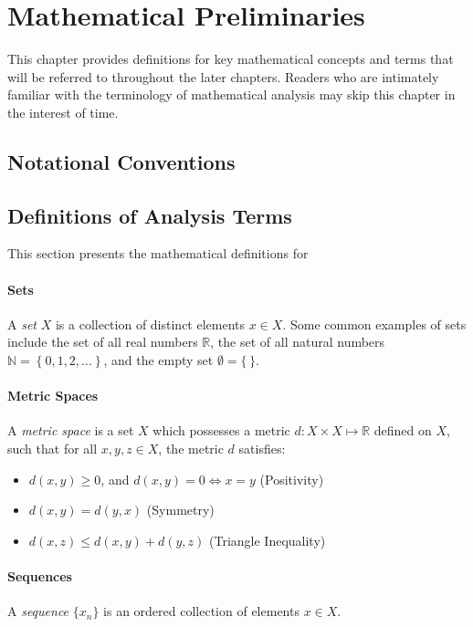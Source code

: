 \chapter{Mathematical Preliminaries}
%

This chapter provides definitions for key mathematical concepts and terms that will be referred to throughout the later chapters. Readers who are intimately familiar with the terminology of mathematical analysis may skip this chapter in the interest of time.

\section{Notational Conventions}

\section{Definitions of Analysis Terms}

This section presents the mathematical definitions for 

\subsubsection*{Sets} A \textit{set} $X$ is a collection of distinct elements $x \in X$. Some common examples of sets include the set of all real numbers $\mathbb{R}$, the set of all natural numbers $\mathbb{N} = \left\{ 0, 1, 2, \ldots \right\}$, and the empty set $\emptyset = \{ \, \}$.

\subsubsection*{Metric Spaces} A \textit{metric space} is a set $X$ which possesses a metric $d \colon X \times X \mapsto \mathbb{R}$ defined on $X$, such that for all $x, y, z \in X$, the metric $d$ satisfies:
\begin{itemize}
  \item $d(x,y) \geq 0$, and $d(x,y) = 0 \Leftrightarrow x = y$ (Positivity)
  \item $d(x,y) = d(y,x)$ (Symmetry)
  \item $d(x,z) \leq d(x,y) + d(y,z)$ (Triangle Inequality)
\end{itemize}

\subsubsection*{Sequences} A \textit{sequence} $\{ x_n \}$ is an ordered collection of elements $x \in X$.

